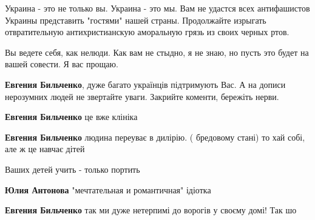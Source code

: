 \begin{itemize}
Украина - это не только вы. Украина - это мы. Вам не удастся всех антифашистов
Украины представить "гостями" нашей страны. Продолжайте изрыгать отвратительную
антихристианскую аморальную грязь из своих черных ртов. 

Вы ведете себя, как нелюди. Как вам не стыдно, я не знаю, но пусть это будет на
вашей совести. Я вас прощаю.

\begin{itemize}
 
\textbf{Евгения Бильченко}, дуже багато українців підтримують Вас. А на дописи нерозумних людей не звертайте уваги. Закрийте коменти, бережіть нерви.

 
\textbf{Евгения Бильченко} це вже клініка🤣

 
\textbf{Евгения Бильченко} людина переуває в дилірію. ( бредовому стані) то хай собі, але ж це навчає дітей

 
Ваших детей учить - только портить

 
\textbf{Юлия Антонова} "мечтательная и романтичная" ідіотка

 
\textbf{Евгения Бильченко} так ми дуже нетерпимі до ворогів у своєму домі! Так шо 👿😈

 

\end{itemize}
\end{itemize}
